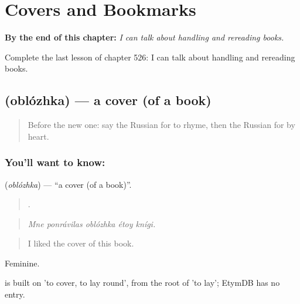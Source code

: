 
\chapter{Covers and Bookmarks}
\label{ch:ru-covers-and-bookmarks}

\begin{chapteropening}
\textbf{By the end of this chapter:} \emph{I can talk about handling and rereading books.}

Complete the last lesson of chapter 526: I can talk about handling and rereading books.
\end{chapteropening}

\section[\texorpdfstring{\ru{обложка} (oblózhka)}{обложка (oblózhka)}]{ (oblózhka) — a cover (of a book)}

\label{lesson:RU-C526-oblozhka}



\begin{quote}
Before the new one: say the Russian for to rhyme, then the Russian for by heart.
\end{quote}

\subsection*{You'll want to know: }
\textbf{} (\emph{oblózhka}) — \textquotedblleft{}a cover (of a book)\textquotedblright{}.

\begin{quote}
    .
\end{quote}

\begin{quote}
\emph{Mne ponrávilas oblózhka étoy knígi.}
\end{quote}

\begin{quote}
I liked the cover of this book.
\end{quote}

Feminine.

\begin{cousinweb}
\emph{} is built on \emph{} 'to cover, to lay round', from the root of \emph{} 'to lay'; EtymDB has no entry.
\end{cousinweb}

